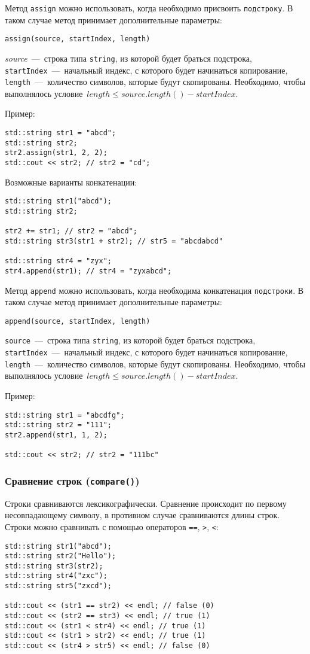 Метод \lstinline|assign| можно использовать, когда необходимо присвоить \texttt{подстроку}. В таком случае метод принимает дополнительные параметры:

\lstinline|assign(source, startIndex, length)|

\textit{source}~---~строка типа \lstinline|string|, из которой будет браться подстрока, \lstinline|startIndex|~---~начальный индекс, с которого будет начинаться копирование, \lstinline|length|~---~количество символов, которые будут скопированы.
Необходимо, чтобы выполнялось условие~$length \leqslant source.length() - startIndex$.

Пример:
\begin{lstlisting}
std::string str1 = "abcd";
std::string str2;
str2.assign(str1, 2, 2);
std::cout << str2; // str2 = "cd";
\end{lstlisting}

Возможные варианты конкатенации:
\begin{lstlisting}
std::string str1("abcd");
std::string str2;

str2 += str1; // str2 = "abcd";
std::string str3(str1 + str2); // str5 = "abcdabcd"

std::string str4 = "zyx";
str4.append(str1); // str4 = "zyxabcd";
\end{lstlisting}

Метод \lstinline|append| можно использовать, когда необходима конкатенация \texttt{подстроки}. В таком случае метод принимает дополнительные параметры:

\lstinline|append(source, startIndex, length)|


\lstinline|source|~---~строка типа \lstinline|string|, из которой будет браться подстрока, \lstinline|startIndex|~---~начальный индекс, с которого будет начинаться копирование, \lstinline|length|~---~количество символов, которые будут скопированы.
Необходимо, чтобы выполнялось условие~$length \leqslant source.length() - startIndex$.

Пример:
\begin{lstlisting}
std::string str1 = "abcdfg";
std::string str2 = "111";
str2.append(str1, 1, 2);

std::cout << str2; // str2 = "111bc"
\end{lstlisting}

\subsubsection{Сравнение строк (\texttt{compare()})}
Строки сравниваются лексикографически. Сравнение происходит по первому несовпадающему символу, в противном случае сравниваются длины строк.
Строки можно сравнивать с помощью операторов \lstinline|==|, \lstinline|>|, \lstinline|<|:
\begin{lstlisting}
std::string str1("abcd");
std::string str2("Hello");
std::string str3(str2);
std::string str4("zxc");
std::string str5("zxcd");

std::cout << (str1 == str2) << endl; // false (0)
std::cout << (str2 == str3) << endl; // true (1)
std::cout << (str1 < str4) << endl; // true (1)
std::cout << (str1 > str2) << endl; // true (1)
std::cout << (str4 > str5) << endl; // false (0)
\end{lstlisting}

